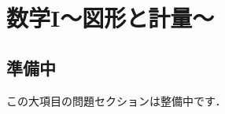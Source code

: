 \documentclass[../../ms_q.tex]{subfiles}
\begin{document}
\section{数学I～図形と計量～}

\subsection*{準備中}
この大項目の問題セクションは整備中です．
\end{document}
